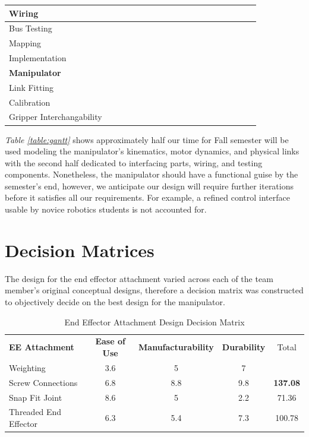 \documentclass[12pt]{report}
\begin{document}
\begin{table}[htp]
\begin{tabular}{C{2.9cm}|cccccccccccccccccc}
\textbf{Wiring} & & & & & & & & & & & & & & & & & & \\\hline
Bus Testing & &  &  &  & & & & & & & & & & & & & & \\
Mapping & & & & & & & & &  &  &  &  &  & & & & & \\
Implementation & & & & & & & & & & & & & &  &  &  &  &  \\
\textbf{Manipulator} & & & & & & & & & & & & & & & & & & \\\hline
Link Fitting & & & & & & & & & & & &  &  &  &  & & & \\
Calibration & & & & & & & & & & & & & & & &  &  &  \\
Gripper Interchangability & & & & & & & & & & & & & &  &  & & & \\
\end{tabular}
\end{table}


\emph{Table \ref{table:gantt}} shows approximately half our time for Fall semester will be used modeling the manipulator’s kinematics, motor dynamics, and physical links with the second half dedicated to interfacing parts, wiring, and testing components. Nonetheless, the manipulator should have a functional guise by the semester’s end, however, we anticipate our design will require further iterations before it satisfies all our requirements. For example, a refined control interface usable by novice robotics students is not accounted for.

\section{Decision Matrices}
The design for the end effector attachment varied across each of the team member’s original conceptual designs, therefore a decision matrix was constructed to objectively decide on the best design for the manipulator.

\begin{table}[htp]
  \center
  \caption{End Effector Attachment Design Decision Matrix}
  \label{table:ee}
\begin{tabular}{C{3.5cm}|cccc}
\textbf{EE Attachment} & \textbf{Ease of Use} & \textbf{Manufacturability} & \textbf{Durability} & Total \\
Weighting & 3.6 & 5 & 7 & \\\hline
Screw Connections & 6.8 & 8.8 & 9.8 & \textbf{137.08} \\
Snap Fit Joint & 8.6 & 5 & 2.2 & 71.36 \\
Threaded End Effector & 6.3 & 5.4 & 7.3 & 100.78 \\
\end{tabular}
\end{table}
\end{document}
